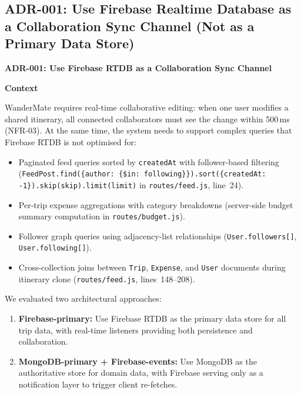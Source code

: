 \documentclass[12pt, a4paper]{article}
\newcommand{\code}[1]{\texttt{\small #1}}
\newcommand{\reqid}[1]{\textsc{\small #1}}
\begin{document}
\subsection{ADR-001: Use Firebase Realtime Database as a Collaboration Sync Channel (Not as a Primary Data Store)}

\begin{tcolorbox}[adrbox]

\textbf{\large ADR-001: Use Firebase RTDB as a Collaboration Sync Channel}

\vspace{0.6em}
\textbf{Context}

WanderMate requires real-time collaborative editing: when one user modifies a shared itinerary, all connected collaborators must see the change within 500\,ms (\reqid{NFR-03}). At the same time, the system needs to support complex queries that Firebase RTDB is not optimised for:

\begin{itemize}
  \item Paginated feed queries sorted by \code{createdAt} with follower-based filtering (\code{FeedPost.find(\{author: \{\$in: following\}\}).sort(\{createdAt: -1\}).skip(skip).limit(limit)} in \code{routes/feed.js}, line~24).
  \item Per-trip expense aggregations with category breakdowns (server-side budget summary computation in \code{routes/budget.js}).
  \item Follower graph queries using adjacency-list relationships (\code{User.followers[]}, \code{User.following[]}).
  \item Cross-collection joins between \code{Trip}, \code{Expense}, and \code{User} documents during itinerary clone (\code{routes/feed.js}, lines~148--208).
\end{itemize}

We evaluated two architectural approaches:
\begin{enumerate}
  \item \textbf{Firebase-primary:} Use Firebase RTDB as the primary data store for all trip data, with real-time listeners providing both persistence and collaboration.
  \item \textbf{MongoDB-primary + Firebase-events:} Use MongoDB as the authoritative store for domain data, with Firebase serving only as a notification layer to trigger client re-fetches.
\end{enumerate}


\end{tcolorbox}
\end{document}
